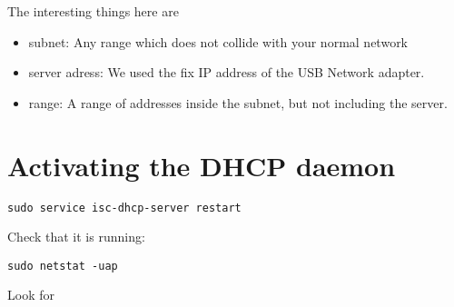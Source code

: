 The interesting things here are 

\begin{itemize}

\item subnet: Any range which does not collide with your normal network

\item server adress: We used the fix IP address of the USB Network adapter.

\item range: A range of addresses inside the subnet, but not including the server.

\end{itemize}


\section{Activating the DHCP daemon}

\begin{verbatim}
sudo service isc-dhcp-server restart
\end{verbatim}

Check that it is running:

\begin{verbatim}
sudo netstat -uap
\end{verbatim}

Look for 
